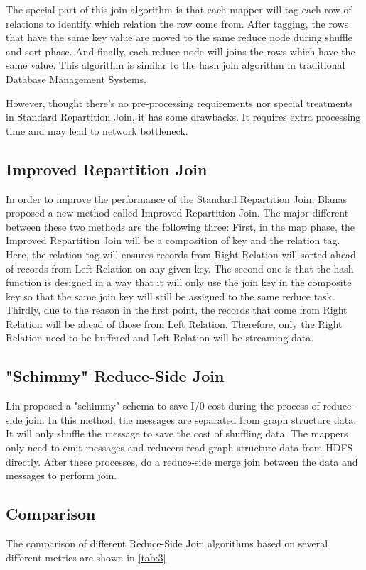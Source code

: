 \documentclass[sigconf, nonacm]{acmart}
\begin{document}
The special part of this join algorithm is that each mapper will tag each row of relations to identify which relation the row come from. After tagging, the rows that have the same key value are moved to the same reduce node during shuffle and sort phase. And finally, each reduce node will joins the rows which have the same value. This algorithm is similar to the hash join algorithm in traditional Database Management Systems.

However, thought there's no pre-processing requirements nor special treatments in Standard Repartition Join, it has some drawbacks. It requires extra processing time and may lead to network bottleneck.

\subsection{Improved Repartition Join}

In order to improve the performance of the Standard Repartition Join, Blanas\cite{blanas2010comparison} proposed a new method called Improved Repartition Join. The major different between these two methods are the following three: First, in the map phase, the Improved Repartition Join will be a composition of key and the relation tag. Here, the relation tag will ensures records from Right Relation will sorted ahead of records from Left Relation on any given key. The second one is that the hash function is designed in a way that it will only use the join key in the composite key so that the same join key will still be assigned to the same reduce task. Thirdly, due to the reason in the first point, the records that come from Right Relation will be ahead of those from Left Relation. Therefore, only the Right Relation need to be buffered and Left Relation will be streaming data. 

\subsection{"Schimmy" Reduce-Side Join}
Lin proposed a "schimmy" schema to save I/0 cost during the process of reduce-side join. \cite{lin2010data} In this method, the messages are separated from graph structure data. It will only shuffle the message to save the cost of shuffling data. The mappers only need to emit messages and reducers read graph structure data from HDFS directly. After these processes, do a reduce-side merge join between the data and messages to perform join.

\subsection{Comparison}
The comparison of different Reduce-Side Join algorithms based on several different metrics are shown in  \autoref{tab:3} 
\end{document}
